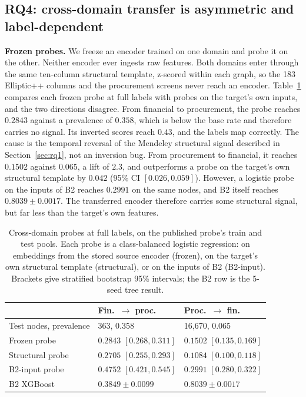 \documentclass[conference]{IEEEtran}
\begin{document}
\subsection{RQ4: cross-domain transfer is asymmetric and label-dependent}
\label{sec:rq4}

\textbf{Frozen probes.} We freeze an encoder trained on one domain and probe it
on the other. Neither encoder ever ingests raw features. Both domains enter
through the same ten-column structural template, z-scored within each graph,
so the 183 Elliptic++ columns and the procurement screens never reach an
encoder. Table~\ref{tab:fulllabel} compares each frozen probe at full labels
with probes on the target's own inputs, and the two directions disagree. From
financial to procurement, the probe reaches $0.2843$ against a prevalence of
$0.358$, which is below the base rate and therefore carries no signal. Its inverted
scores reach $0.43$, and the labels map correctly. The cause is the temporal
reversal of the Mendeley structural signal described in
Section~\ref{sec:rq1}, not an inversion bug. From
procurement to financial, it reaches $0.1502$ against $0.065$, a lift of $2.3$,
and outperforms a probe on the target's own structural template by $0.042$
(95\% CI $[0.026, 0.059]$). However, a logistic probe on the inputs of B2
reaches $0.2991$ on the same nodes, and B2 itself reaches $0.8039 \pm 0.0017$.
The transferred encoder therefore carries some structural signal, but far less
than the target's own features.

\begin{table}[t]
\caption{Cross-domain probes at full labels, on the published probe's train
and test pools. Each probe is a class-balanced logistic regression: on
embeddings from the stored source encoder (frozen), on the target's own
structural template (structural), or on the inputs of B2 (B2-input). Brackets
give stratified bootstrap 95\% intervals; the B2 row is the 5-seed tree
result.}
\label{tab:fulllabel}
\centering
\footnotesize
\setlength{\tabcolsep}{3pt}
\begin{tabular}{lll}
\toprule
 & Fin.\ $\rightarrow$ proc. & Proc.\ $\rightarrow$ fin. \\
\midrule
Test nodes, prevalence & 363, 0.358 & 16,670, 0.065 \\
Frozen probe & $0.2843$ $[0.268, 0.311]$ & $0.1502$ $[0.135, 0.169]$ \\
Structural probe & $0.2705$ $[0.255, 0.293]$ & $0.1084$ $[0.100, 0.118]$ \\
B2-input probe & $0.4752$ $[0.421, 0.545]$ & $0.2991$ $[0.280, 0.322]$ \\
B2 XGBoost & $0.3849 \pm 0.0099$ & $0.8039 \pm 0.0017$ \\
\bottomrule
\end{tabular}
\end{table}
\end{document}
